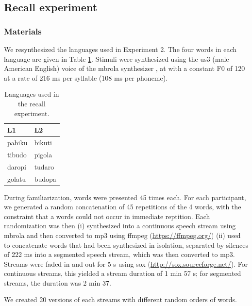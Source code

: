 \documentclass[]{article}
\begin{document}
\subsection{Recall experiment}\label{recall-experiment}

\subsubsection{Materials}\label{materials}

We resynthesized the languages used in \citet{Saffran-Science}
Experiment 2. The four words in each language are given in Table
\ref{tab:recall-languages}. Stimuli were synthesized using the us3 (male
American English) voice of the mbrola synthesizer \citep{mbrola}, at
with a constant F0 of 120 at a rate of 216 ms per syllable (108 ms per
phoneme).

\begin{table}

\caption{\label{tab:recall-print-languages}\label{tab:recall-languages}Languages used in the recall experiment.}
\centering
\begin{tabular}[t]{ll}
\toprule
L1 & L2\\
\midrule
pabiku & bikuti\\
tibudo & pigola\\
daropi & tudaro\\
golatu & budopa\\
\bottomrule
\end{tabular}
\end{table}

During familiarization, words were presented 45 times each. For each
participant, we generated a random concatenation of 45 repetitions of
the 4 words, with the constraint that a words could not occur in
immediate reptition. Each randomization was then (i) synthesized into a
continuous speech stream using mbrola and then converted to mp3 using
ffmpeg (\url{https://ffmpeg.org/}) (ii) used to concatenate words that
had been synthesized in isolation, separated by silences of 222 ms into
a segmented speech stream, which was then converted to mp3. Streams were
faded in and out for 5 s using sox (\url{http://sox.sourceforge.net/}).
For continuous streams, this yielded a stream duration of 1 min 57 s;
for segmented streams, the duration was 2 min 37.

We created 20 versions of each streams with different random orders of
words.

\clearpage
\end{document}
